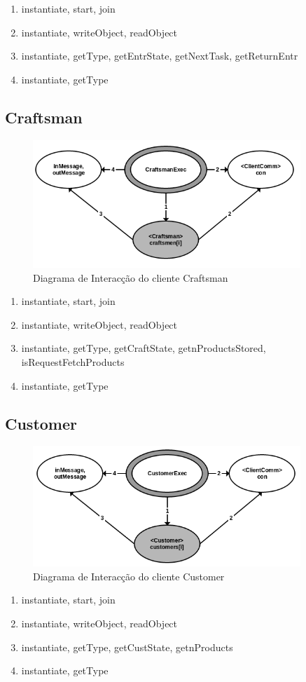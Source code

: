 \documentclass[11pt,a4paper]{report}
\begin{document}
\begin{enumerate}
\itemsep-0.4em 
\item instantiate, start, join
\item instantiate, writeObject, readObject
\item instantiate, getType, getEntrState, getNextTask, getReturnEntr
\item instantiate, getType
\end{enumerate}

\subsection{Craftsman}

\begin{figure}[h]
    \centering
    \includegraphics[width=0.9\textwidth]{images/craftsman.png}
    \caption{Diagrama de Interacção do cliente Craftsman}
    \label{fig:awesome_image}
\end{figure}

\begin{enumerate}
\itemsep-0.4em 
\item instantiate, start, join
\item instantiate, writeObject, readObject
\item instantiate, getType, getCraftState, getnProductsStored, isRequestFetchProducts
\item instantiate, getType
\end{enumerate}

\subsection{Customer}

\begin{figure}[h]
    \centering
    \includegraphics[width=0.9\textwidth]{images/customer.png}
    \caption{Diagrama de Interacção do cliente Customer}
    \label{fig:awesome_image}
\end{figure}

\begin{enumerate}
\itemsep-0.4em 
\item instantiate, start, join
\item instantiate, writeObject, readObject
\item instantiate, getType, getCustState, getnProducts
\item instantiate, getType
\end{enumerate}
\end{document}

